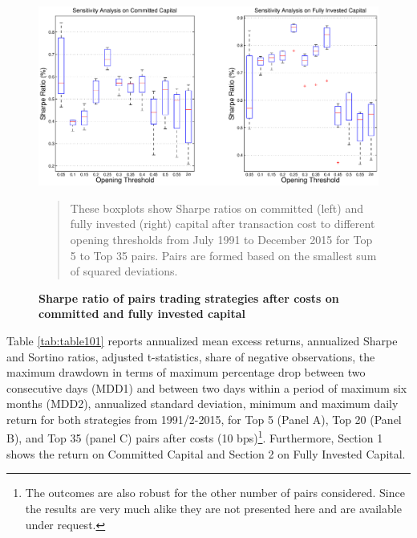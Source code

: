 \begin{figure}[!ht]
	\centering
\includegraphics[width=\linewidth]{Figure2.eps}
\captionsetup{justification=raggedright,
	singlelinecheck=false
}
\caption{\textbf {Sharpe ratio of pairs trading strategies after costs on committed and fully invested capital}}
\begin{quote} {\scriptsize These boxplots show Sharpe ratios on committed (left) and fully invested (right) capital after transaction cost to different opening thresholds from July 1991 to December 2015 for Top 5 to Top 35 pairs. Pairs are formed based on the smallest sum of squared deviations.}\end{quote}
\label{fig:Figure2}
\end{figure}

Table \ref{tab:table101} reports annualized mean excess returns, annualized Sharpe and Sortino ratios, \citet*{nw87} adjusted t-statistics, share of negative observations, the maximum drawdown in terms of maximum percentage drop between two consecutive days (MDD1) and between two days within a period of maximum six months (MDD2), annualized standard deviation, minimum and maximum daily return for both strategies from 1991/2-2015, for Top 5 (Panel A), Top 20 (Panel B), and Top 35 (panel C) pairs after costs (10 bps)\footnote{The outcomes are also robust for the other number of pairs considered. Since the results are very much alike they are not presented here and are available under request.}. Furthermore, Section 1 shows the return on Committed Capital and Section 2 on Fully Invested Capital. %
	
